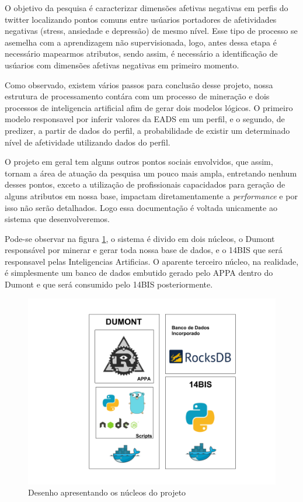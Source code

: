 O objetivo da pesquisa é caracterizar dimensões afetivas negativas em perfis do twitter localizando pontos comuns entre usúarios portadores de afetividades negativas (stress, ansiedade e depressão) de mesmo nível. Esse tipo de processo se asemelha com a aprendizagem não supervisionada, logo, antes dessa etapa é necessário mapearmos atributos, sendo assim, é necessário a identificação de usúarios com dimensões afetivas negativas em primeiro momento.

Como observado, existem vários passos para conclusão desse projeto, nossa estrutura de processamento contára com um processo de mineração e dois processos de inteligencia artificial afim de gerar dois modelos lógicos. O primeiro modelo responsavel por inferir valores da EADS em um perfil, e o segundo, de predizer, a partir de dados do perfil, a probabilidade de existir um determinado nível de afetividade utilizando dados do perfil.

O projeto em geral tem alguns outros pontos sociais envolvidos, que assim, tornam a área de atuação da pesquisa um pouco mais ampla, entretando nenhum desses pontos, exceto a utilização de profissionais capacidados para geração de alguns atributos em nossa base, impactam diretamentamente a \textit{performance} e por isso não serão detalhados. Logo essa documentação é voltada unicamente ao sistema que desenvolveremos.

Pode-se observar na figura \ref{fig:tecnologias}, o sistema é divido em dois núcleos, o Dumont responsável por minerar e gerar toda nossa base de dados, e o 14BIS que será responsavel pelas Inteligencias Artificias. O aparente terceiro núcleo, na realidade, é simplesmente um banco de dados embutido gerado pelo APPA dentro do Dumont e que será consumido pelo 14BIS posteriormente.

\begin{figure}
    \centering
    \includegraphics[width=.8\textwidth]{imagens/tecnologias.png}
    \caption{Desenho apresentando os núcleos do projeto}
    \label{fig:tecnologias}
\end{figure}

